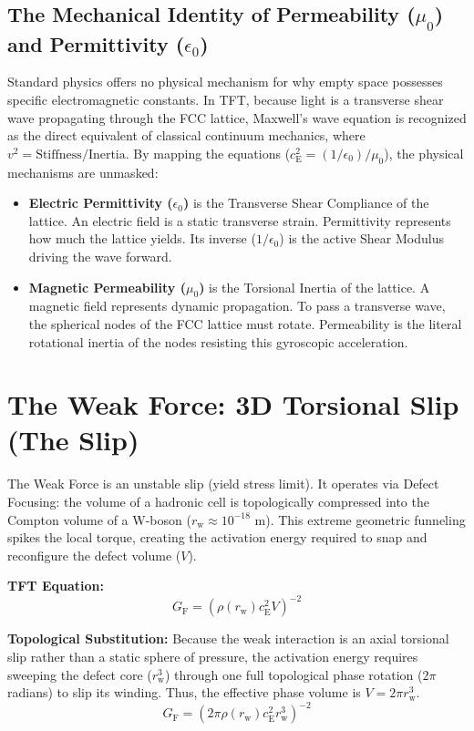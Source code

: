 \subsection{The Mechanical Identity of Permeability ($\mu_0$) and Permittivity ($\epsilon_0$)}
Standard physics offers no physical mechanism for why empty space possesses specific electromagnetic constants. In TFT, because light is a transverse shear wave propagating through the FCC lattice, Maxwell's wave equation is recognized as the direct equivalent of classical continuum mechanics, where $v^2 = \text{Stiffness} / \text{Inertia}$. By mapping the equations ($c_{\mathrm{E}}^2 = (1/\epsilon_0) / \mu_0$), the physical mechanisms are unmasked:
\begin{itemize}
    \item \textbf{Electric Permittivity ($\epsilon_0$)} is the Transverse Shear Compliance of the lattice. An electric field is a static transverse strain. Permittivity represents how much the lattice yields. Its inverse ($1/\epsilon_0$) is the active Shear Modulus driving the wave forward.
    \item \textbf{Magnetic Permeability ($\mu_0$)} is the Torsional Inertia of the lattice. A magnetic field represents dynamic propagation. To pass a transverse wave, the spherical nodes of the FCC lattice must rotate. Permeability is the literal rotational inertia of the nodes resisting this gyroscopic acceleration.
\end{itemize}

\section{The Weak Force: 3D Torsional Slip (The Slip)}
The Weak Force is an unstable slip (yield stress limit). It operates via Defect Focusing: the volume of a hadronic cell is topologically compressed into the Compton volume of a W-boson ($r_{\mathrm{w}} \approx 10^{-18}$ m). This extreme geometric funneling spikes the local torque, creating the activation energy required to snap and reconfigure the defect volume ($V$).

\vspace{0.5em}
\noindent\textbf{TFT Equation:}
\begin{equation}
    G_{\mathrm{F}} = (\rho(r_{\mathrm{w}}) c_{\mathrm{E}}^2 V)^{-2}
\end{equation}

\vspace{0.5em}
\noindent\textbf{Topological Substitution:} Because the weak interaction is an axial torsional slip rather than a static sphere of pressure, the activation energy requires sweeping the defect core ($r_{\mathrm{w}}^3$) through one full topological phase rotation ($2\pi$ radians) to slip its winding. Thus, the effective phase volume is $V = 2\pi r_{\mathrm{w}}^3$.
\begin{equation}
    G_{\mathrm{F}} = (2\pi \rho(r_{\mathrm{w}}) c_{\mathrm{E}}^2 r_{\mathrm{w}}^3)^{-2}
\end{equation}

